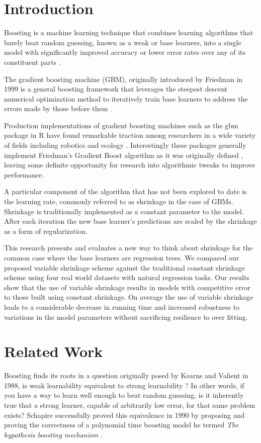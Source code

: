 \documentclass[9pt, conference]{IEEEtran}
\begin{document}
\section{Introduction}

Boosting is a machine learning technique that combines learning algorithms that barely beat random guessing, known as a weak or base learners, into a single model with significantly improved accuracy or lower error rates over any of its constituent parts \cite{StrengthOfWeak}  \cite{BoostingSurvey}. 

The gradient boosting machine (GBM), originally introduced by Friedman in 1999 is a general boosting framework that leverages the steepest descent numerical optimization method to iteratively train base learners to address the errors made by those before them \cite{2001Friedman}.

Production implementations of gradient boosting machines such as the gbm package in R have found remarkable traction among researchers in a wide variety of fields including robotics and ecology \cite{GBMTut} \cite{ecological}. Interestingly these packages generally implement Friedman's Gradient Boost algorithm as it was originally defined \cite{2012ridgeway}, leaving some definite opportunity for research into algorithmic tweaks to improve performance. 

A particular component of the algorithm that has not been explored to date is the learning rate, commonly referred to as shrinkage in the case of GBMs. Shrinkage is traditionally implemented as a constant parameter to the model. After each iteration the new base learner's predictions are scaled by the shrinkage as a form of regularization. 

This research presents and evaluates a new way to think about shrinkage for the common case where the base learners are regression trees. We compared our proposed variable shrinkage scheme against the traditional constant shrinkage scheme using four real world datasets with natural regression tasks. Our results show that the use of variable shrinkage results in models with competitive error to those built using constant shrinkage. On average the use of variable shrinkage leads to a considerable decrease in running time and increased robustness to variations in the model parameters without sacrificing resilience to over fitting. 

\section{Related Work}
\label{sec:RelatedWork}
Boosting finds its roots in a question originally posed by Kearns and Valient in 1988, is weak learnability equivalent to strong learnability\cite{Kearns:1988} \cite{KearnsValient:1989}? In other words, if you have a way to learn well enough to beat random guessing, is it inherently true that a strong learner, capable of arbitrarily low error, for that same problem exists? Schapire successfully proved this equivalence in 1990 by proposing and proving the correctness of a polynomial time boosting model he termed \textit{The hypothesis boosting mechanism} \cite{StrengthOfWeak}. 
\end{document}
